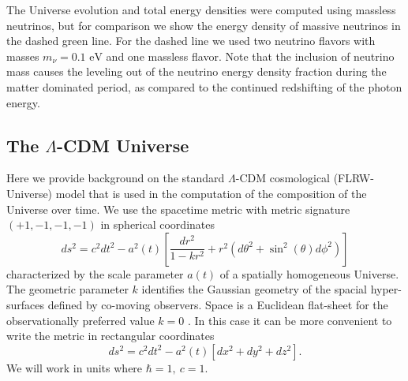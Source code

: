 \documentclass[universe,article,submit,moreauthors,pdftex,a4paper]{Definitions/mdpi}
\newcommand{\eV}{\text{ eV}}
\newcommand{\beqn}{\begin{equation}}
\newcommand{\eeqn}{\end{equation}}
\begin{document}
The Universe evolution and total energy densities were computed using massless neutrinos, but  for comparison we show the energy density of massive neutrinos in the dashed green line. For the dashed line we used two neutrino flavors with masses $m_\nu=0.1\eV$ and one massless flavor.  Note that the inclusion of neutrino mass causes the leveling out of the neutrino energy density fraction during the matter dominated period, as compared to the continued redshifting of the photon energy.

\subsection{The $\Lambda$-CDM Universe}\label{sec:Cosmo}
\noindent Here we provide background on the standard $\Lambda$-CDM cosmological (FLRW-Universe) model that is used in the computation of the composition of the Universe over time. We use the spacetime metric with metric signature $(+1,-1,-1,-1)$ in spherical coordinates
\beqn\label{metric}
ds^2=c^2dt^2-a^2(t)\left[ \frac{dr^2}{1-kr^2}+r^2(d\theta^2+\sin^2(\theta)d\phi^2)\right]
\eeqn
characterized  by the scale parameter $a(t)$  of a spatially homogeneous  Universe. The geometric parameter $k$ identifies the Gaussian geometry of the spacial hyper-surfaces defined by co-moving observers. Space is a Euclidean flat-sheet for the observationally preferred value $k=0$ \cite{Planck:2013pxb,Planck:2015fie,Planck:2018vyg}. In this case it can be more convenient to write the metric in rectangular coordinates
\beqn\label{metric2}
ds^2=c^2dt^2-a^2(t)\left[ dx^2+dy^2+dz^2\right].
\eeqn
We will work in units where $\hbar=1,\ c=1$.
\end{document}
